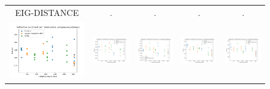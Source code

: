 \begin{figure}
\begin{tabular}{@{\hskip -0.0in}c@{\hskip -0.0in}c@{\hskip -0.0in}c@{\hskip -0.0in}c@{\hskip -0.0in}c@{\hskip -0.0in}}
		EIG-DISTANCE & . & . & . & .\\
		\includegraphics[width=.2\linewidth]{figures/fasttext1m_sentiment_mr_test-acc_vs_subspace-eig-distance_linx.pdf} &
		\includegraphics[width=.2\linewidth]{figures/fasttext1m_sentiment_subj_test-acc_vs_subspace-eig-distance_linx.pdf} &
		\includegraphics[width=.2\linewidth]{figures/fasttext1m_sentiment_cr_test-acc_vs_subspace-eig-distance_linx.pdf} &
		\includegraphics[width=.2\linewidth]{figures/fasttext1m_sentiment_sst_test-acc_vs_subspace-eig-distance_linx.pdf} &
		\includegraphics[width=.2\linewidth]{figures/fasttext1m_sentiment_mpqa_test-acc_vs_subspace-eig-distance_linx.pdf} \\
		

\end{tabular}
\end{figure}
